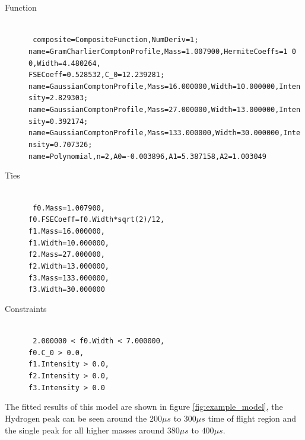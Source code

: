 \documentclass[a4paper]{article}
\begin{document}
\begin{description}
  \item[Function] \hfill \\
    \texttt{
    composite=CompositeFunction,NumDeriv=1;\\
    name=GramCharlierComptonProfile,Mass=1.007900,HermiteCoeffs=1 0 0,Width=4.480264,\\
    FSECoeff=0.528532,C\_0=12.239281;\\
    name=GaussianComptonProfile,Mass=16.000000,Width=10.000000,Intensity=2.829303;\\
    name=GaussianComptonProfile,Mass=27.000000,Width=13.000000,Intensity=0.392174;\\
    name=GaussianComptonProfile,Mass=133.000000,Width=30.000000,Intensity=0.707326;\\
    name=Polynomial,n=2,A0=-0.003896,A1=5.387158,A2=1.003049
    }

  \item[Ties] \hfill \\
    \texttt{
      f0.Mass=1.007900,\\
      f0.FSECoeff=f0.Width*sqrt(2)/12,\\
      f1.Mass=16.000000,\\
      f1.Width=10.000000,\\
      f2.Mass=27.000000,\\
      f2.Width=13.000000,\\
      f3.Mass=133.000000,\\
      f3.Width=30.000000
    }

  \item[Constraints] \hfill \\
    \texttt{
      2.000000 < f0.Width < 7.000000,\\
      f0.C\_0 > 0.0,\\
      f1.Intensity > 0.0,\\
      f2.Intensity > 0.0,\\
      f3.Intensity > 0.0
    }
\end{description}

The fitted results of this model are shown in figure \ref{fig:example_model},
the Hydrogen peak can be seen around the $200 \mu s$ to $300 \mu s$ time of
flight region and the single peak for all higher masses around $380 \mu s$ to
$400 \mu s$.
\end{document}
